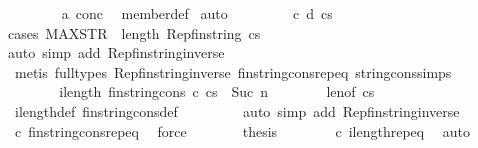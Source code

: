 \begin{isabellebody}
\ \ \ \ \ \ \isamarkupfalse%
\ a\ conc\ \isamarkupfalse%
\ member{\isacharunderscore}def\ \isamarkupfalse%
{\isacharparenleft}auto{\isacharparenright}\isanewline
\ \ \ \ \ \ \isamarkupfalse%
\ \ c\ d\ cs\isanewline
\ \ \ \ \ \ \ \ \isamarkupfalse%
{\isacharparenleft}cases\ {\isachardoublequoteopen}MAX{\isacharunderscore}STR\ {\isasymle}\ length\ {\isacharparenleft}Rep{\isacharunderscore}fin{\isacharunderscore}string\ cs{\isacharparenright}{\isachardoublequoteclose}{\isacharparenright}\isanewline
\ \ \ \ \ \ \ \ \ \isamarkupfalse%
{\isacharparenleft}auto\ simp\ add{\isacharcolon}\ Rep{\isacharunderscore}fin{\isacharunderscore}string{\isacharunderscore}inverse{\isacharparenright}\isanewline
\ \ \ \ \ \ \ \ \isamarkupfalse%
\ {\isacharparenleft}metis\ {\isacharparenleft}full{\isacharunderscore}types{\isacharparenright}\ Rep{\isacharunderscore}fin{\isacharunderscore}string{\isacharunderscore}inverse\ fin{\isacharunderscore}string{\isacharunderscore}cons{\isachardot}rep{\isacharunderscore}eq\ string{\isacharunderscore}cons{\isachardot}simps{\isacharparenright}{\isacharplus}\ \isanewline
\ \ \ \ \ \ \isamarkupfalse%
\isanewline
\ \ \ \ \isamarkupfalse%
\ \isamarkupfalse%
\ {\isachardoublequoteopen}ilength\ {\isacharparenleft}fin{\isacharunderscore}string{\isacharunderscore}cons\ c\ cs{\isacharparenright}\ {\isasymle}\ {\isacharparenleft}Suc\ n{\isacharparenright}{\isachardoublequoteclose}\isanewline
\ \ \ \ \ \ \isamarkupfalse%
\ len{\isacharbrackleft}of\ cs{\isacharbrackright}\ \isamarkupfalse%
\ ilength{\isacharunderscore}def\ fin{\isacharunderscore}string{\isacharunderscore}cons{\isacharunderscore}def\ \isanewline
\ \ \ \ \ \ \isamarkupfalse%
\ {\isacharparenleft}auto\ simp\ add{\isacharcolon}\ Rep{\isacharunderscore}fin{\isacharunderscore}string{\isacharunderscore}inverse{\isacharparenright}\isanewline
\ \ \ \ \ \ \isamarkupfalse%
\ c\ fin{\isacharunderscore}string{\isacharunderscore}cons{\isachardot}rep{\isacharunderscore}eq\ \isamarkupfalse%
\ force\isanewline
\ \ \ \ \isamarkupfalse%
\ \isamarkupfalse%
\ {\isacharquery}thesis\isanewline
\ \ \ \ \ \ \isamarkupfalse%
\ c\ ilength{\isachardot}rep{\isacharunderscore}eq\ \isamarkupfalse%
\ auto\isanewline
\ \ \isamarkupfalse%
\isanewline
\ \ \isamarkupfalse%

\end{isabellebody}

